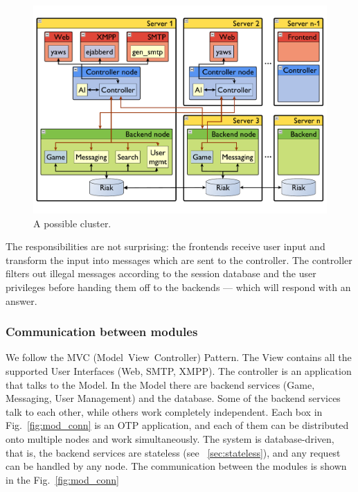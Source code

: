 \documentclass[11pt,a4paper]{report}
\begin{document}
\begin{figure}[h]
 \centering
 \includegraphics[width=\textwidth]{./graphics/arch.pdf}
 \caption{A possible cluster.}
 \label{fig:arch}
\end{figure}

The responsibilities are not surprising: the frontends receive user input and
transform the input into messages which are sent to the controller.
The controller filters out illegal messages according to the session database
and the user privileges before handing them off to the backends --- which will
respond with an answer.

\subsubsection{Communication between modules}
We follow the MVC\cite{mvc} (Model~View~Controller) Pattern.
The View contains all the supported User Interfaces (Web, SMTP, XMPP). The
controller is an application that talks to the Model. In the Model there
are backend services (Game, Messaging, User Management) and the database.
Some of the backend services talk to each other, while others work completely
independent. Each box in Fig.~\ref{fig:mod_conn} is an OTP application, and
each of them can be distributed onto multiple nodes and work simultaneously.
The system is database-driven, that is, the backend services are stateless
(see ~\ref{sec:stateless}), and any request can be handled
by any node. The communication between the modules is shown in the
Fig.~\ref{fig:mod_conn}
\end{document}
